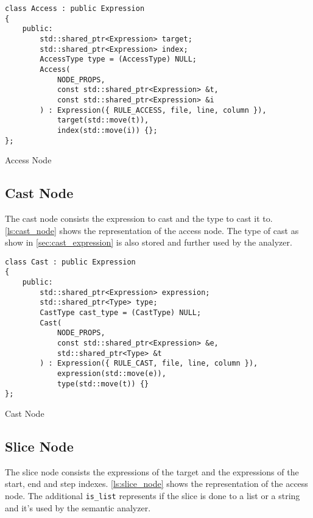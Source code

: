\begin{listing}[H]
\begin{verbatim}
class Access : public Expression
{
    public:
        std::shared_ptr<Expression> target;
        std::shared_ptr<Expression> index;
        AccessType type = (AccessType) NULL;
        Access(
            NODE_PROPS,
            const std::shared_ptr<Expression> &t,
            const std::shared_ptr<Expression> &i
        ) : Expression({ RULE_ACCESS, file, line, column }),
            target(std::move(t)),
            index(std::move(i)) {};
};
\end{verbatim}
\caption{Access Node}
\label{ls:access_node}
\end{listing}

\subsection{Cast Node}

The cast node consists the expression to cast and the type to cast it to.
\autoref{ls:cast_node} shows the representation of the access node.
The type of cast as show in \autoref{sec:cast_expression} is also stored and further used by the analyzer.

\begin{listing}[H]
\begin{verbatim}
class Cast : public Expression
{
    public:
        std::shared_ptr<Expression> expression;
        std::shared_ptr<Type> type;
        CastType cast_type = (CastType) NULL;
        Cast(
            NODE_PROPS,
            const std::shared_ptr<Expression> &e,
            std::shared_ptr<Type> &t
        ) : Expression({ RULE_CAST, file, line, column }),
            expression(std::move(e)),
            type(std::move(t)) {}
};
\end{verbatim}
\caption{Cast Node}
\label{ls:cast_node}
\end{listing}

\subsection{Slice Node}

The slice node consists the expressions of the target and the expressions of the start, end and step indexes.
\autoref{ls:slice_node} shows the representation of the access node.
The additional \texttt{is\_list} represents if the slice is done to a list or a string and it's used by the semantic analyzer.

